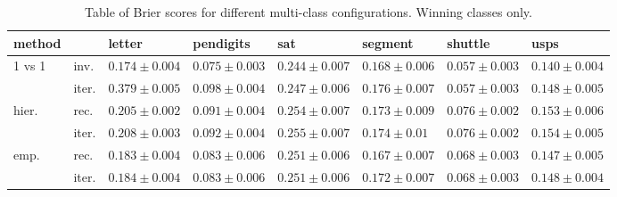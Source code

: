 \begin{table}
	\caption{Table of Brier scores for different multi-class configurations. Winning classes only.}
{\small
\begin{tabular}{|ll|llllll|}
\hline
 method & & letter & pendigits & sat & segment & shuttle & usps\\
\hline\hline
1 vs 1 & inv. & $0.174 \pm 0.004 $ & $0.075 \pm 0.003 $ & $0.244 \pm 0.007 $ & $0.168 \pm 0.006 $ & $0.057 \pm 0.003 $ & $0.140 \pm 0.004 $ \\
 & iter. & $0.379 \pm 0.005 $ & $0.098 \pm 0.004 $ & $0.247 \pm 0.006 $ & $0.176 \pm 0.007 $ & $0.057 \pm 0.003 $ & $0.148 \pm 0.005 $ \\
hier. & rec. & $0.205 \pm 0.002 $ & $0.091 \pm 0.004 $ & $0.254 \pm 0.007 $ & $0.173 \pm 0.009 $ & $0.076 \pm 0.002 $ & $0.153 \pm 0.006 $ \\
 & iter. & $0.208 \pm 0.003 $ & $0.092 \pm 0.004 $ & $0.255 \pm 0.007 $ & $0.174 \pm 0.01 $ & $0.076 \pm 0.002 $ & $0.154 \pm 0.005 $ \\
emp. & rec. & $0.183 \pm 0.004 $ & $0.083 \pm 0.006 $ & $0.251 \pm 0.006 $ & $0.167 \pm 0.007 $ & $0.068 \pm 0.003 $ & $0.147 \pm 0.005 $ \\
 & iter. & $0.184 \pm 0.004 $ & $0.083 \pm 0.006 $ & $0.251 \pm 0.006 $ & $0.172 \pm 0.007 $ & $0.068 \pm 0.003 $ & $0.148 \pm 0.004 $ \\
\hline
\end{tabular}
}
\end{table}

